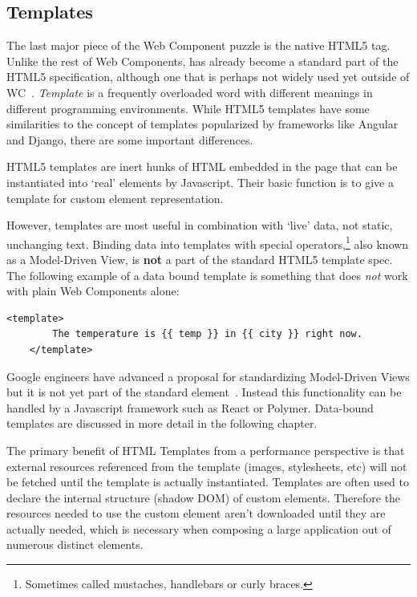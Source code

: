 \subsection{Templates}
The last major piece of the Web Component puzzle is the native HTML5  tag. 
Unlike the rest of Web Components,  has already become a standard part of the HTML5 specification, 
although one that is perhaps not widely used yet outside of WC~\cite{w3ccontributors2015-c}.
\textit{Template} is a frequently overloaded word with different meanings in different programming environments.
While HTML5 templates have some similarities to the concept of templates popularized by frameworks like Angular and Django, there are some important differences.

HTML5 templates are inert hunks of HTML embedded in the page that can be instantiated into `real' elements by Javascript.
Their basic function is to give a template for custom element representation.

However, templates are most useful in combination with `live' data, not static, unchanging text.
Binding data into templates with special operators,\footnote{
Sometimes called mustaches, handlebars or curly braces. }
also known as a Model-Driven View,
is \textbf{not} a part of the standard HTML5 template spec.
The following example of a data bound template is something that does \textit{not} work with plain Web Components alone:

\begin{lstlisting}[language=HTML5,numbers=none]
	<template> 
		The temperature is {{ temp }} in {{ city }} right now.
	</template>
\end{lstlisting}

Google engineers have advanced a proposal for standardizing Model-Driven Views but it is not yet part of the standard  element~\cite{googledevelopers2014}.
Instead this functionality can be handled by a Javascript framework such as React or Polymer.
Data-bound templates are discussed in more detail in the following chapter.

The primary benefit of HTML Templates from a performance perspective is that external resources referenced from the template (images, stylesheets, etc) will not be fetched until the template is actually instantiated.
Templates are often used to declare the internal structure (shadow DOM) of custom elements. 
Therefore the resources needed to use the custom element aren't downloaded until they are actually needed, which is necessary when composing a large application out of numerous distinct elements.


